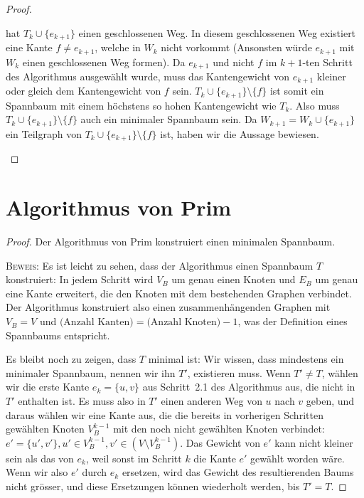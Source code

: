 \documentclass[12pt,a4paper]{report}
\theoremstyle{break}
\theoremstyle{plain}
\newtheorem{proof}{Satz}[chapter]
\begin{document}
\begin{proof}
\begin{enumerate}
  hat $T_k \cup \{e_{k+1}\}$ einen geschlossenen Weg. In diesem
  geschlossenen Weg existiert eine Kante $f \neq e_{k+1}$, welche in $W_k$
  nicht vorkommt (Ansonsten w\"{u}rde $e_{k+1}$ mit $W_k$ einen
  geschlossenen Weg formen). Da $e_{k+1}$ und nicht $f$ im $k+1$-ten Schritt
  des Algorithmus ausgew\"{a}hlt wurde, muss das Kantengewicht von $e_{k+1}$
  kleiner oder gleich dem Kantengewicht von $f$ sein. $T_k \cup \{e_{k+1}\}
  \setminus \{f\}$ ist somit ein Spannbaum mit einem h\"{o}chstens so
  hohen Kantengewicht wie $T_k$. Also muss $T_k \cup \{e_{k+1}\} \setminus
  \{f\}$ auch ein minimaler Spannbaum sein. Da $W_{k+1} = W_k \cup \{e_{k+1}\}
  $ ein Teilgraph von $T_k \cup \{e_{k+1}\}
  \setminus \{f\}$ ist, haben wir die Aussage bewiesen.
\end{enumerate}

 \end{proof}

\newpage
\section{Algorithmus von Prim}

\begin{proof}\label{primproof}Der Algorithmus von Prim konstruiert
  einen minimalen Spannbaum.

 \bigskip\noindent\textsc{Beweis:} Es ist leicht zu sehen, dass der
 Algorithmus einen Spannbaum $T$ konstruiert: In jedem Schritt wird
 $V_B$ um genau einen Knoten und $E_B$ um genau eine Kante
 erweitert, die den Knoten mit dem bestehenden Graphen verbindet. Der
 Algorithmus konstruiert also einen zusammenh\"{a}ngenden Graphen mit $V_B =
 V$ und $\textrm{(Anzahl Kanten)} = \textrm{(Anzahl Knoten)}-1$, was
 der Definition eines Spannbaums entspricht.

 Es bleibt noch zu zeigen, dass $T$ minimal ist: Wir wissen, dass
 mindestens ein minimaler Spannbaum, nennen wir ihn $T'$, existieren
 muss. Wenn $T' \neq T$, w\"{a}hlen wir die erste Kante $e_k = \{u,v\}$
 aus Schritt~2.1 des Algorithmus aus, die nicht in $T'$
 enthalten ist. Es muss also in $T'$ einen anderen Weg von $u$ nach
 $v$ geben, und daraus w\"{a}hlen wir eine Kante aus, die die bereits
 in vorherigen Schritten gew\"{a}hlten Knoten $V_B^{k-1}$ mit den noch
 nicht gew\"{a}hlten Knoten verbindet: $e' = \{u',v'\}, u'
 \in V_B^{k-1}, v' \in (V\!\setminus\!V_B^{k-1})$. Das Gewicht von
 $e'$ kann nicht kleiner sein als das von $e_k$, weil sonst im Schritt
 $k$ die Kante $e'$ gew\"{a}hlt worden w\"{a}re. Wenn wir also $e'$
 durch $e_k$ ersetzen, wird das Gewicht des resultierenden Baums nicht
 gr\"{o}sser, und diese Ersetzungen k\"{o}nnen wiederholt werden, bis
 $T' = T$.

\end{proof}
\end{document}
